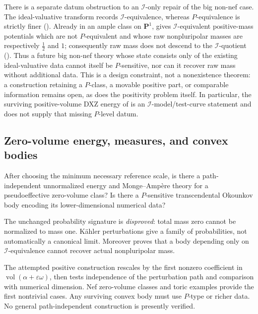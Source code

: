 There is a separate datum obstruction to an \(\mathcal I\)-only repair of
the big non-nef case.  The ideal-valuative transform records
\(\mathcal I\)-equivalence, whereas \(P\)-equivalence is strictly finer
().  Already
in an ample class on \(\mathbf P^1\),  gives
\(\mathcal I\)-equivalent positive-mass potentials which are not
\(P\)-equivalent and whose raw nonpluripolar masses are respectively
\(\tfrac12\) and \(1\); consequently raw mass does not descend to the
\(\mathcal I\)-quotient ().  Thus a
future big non-nef theory whose state consists only of the existing
ideal-valuative data cannot itself be \(P\)-sensitive, nor can it recover
raw mass without additional data.  This is a design constraint, not a
nonexistence theorem: a construction retaining a \(P\)-class, a movable
positive part, or comparable information remains open, as does the
positivity problem itself.  In particular, the surviving positive-volume
DXZ energy of  is an
\(\mathcal I\)-model/test-curve statement and does not supply that missing
\(P\)-level datum.

\subsection{Zero-volume energy, measures, and convex bodies}
\label{sec:ch72-zero-volume}

\begin{problem}\label{prob:frontier-zero-volume}
After choosing the minimum necessary reference scale, is there a
path-independent unnormalized energy and Monge--Ampère theory for a
pseudoeffective zero-volume class?  Is there a \(P\)-sensitive
transcendental Okounkov body encoding its lower-dimensional numerical data?
\end{problem}

The unchanged probability signature is \emph{disproved}: total mass zero
cannot be normalized to mass one.  Kähler perturbations give a family of
probabilities, not automatically a canonical limit.  Moreover
 proves that a body depending only on
\(\mathcal I\)-equivalence cannot recover actual nonpluripolar mass.

The attempted positive construction rescales by the first nonzero coefficient
in \(\operatorname{vol}(\alpha+\varepsilon\omega)\), then tests independence
of the perturbation path and comparison with numerical dimension.  Nef
zero-volume classes and toric examples provide the first nontrivial cases.
Any surviving convex body must use \(P\)-type or richer data.  No general
path-independent construction is presently verified.

